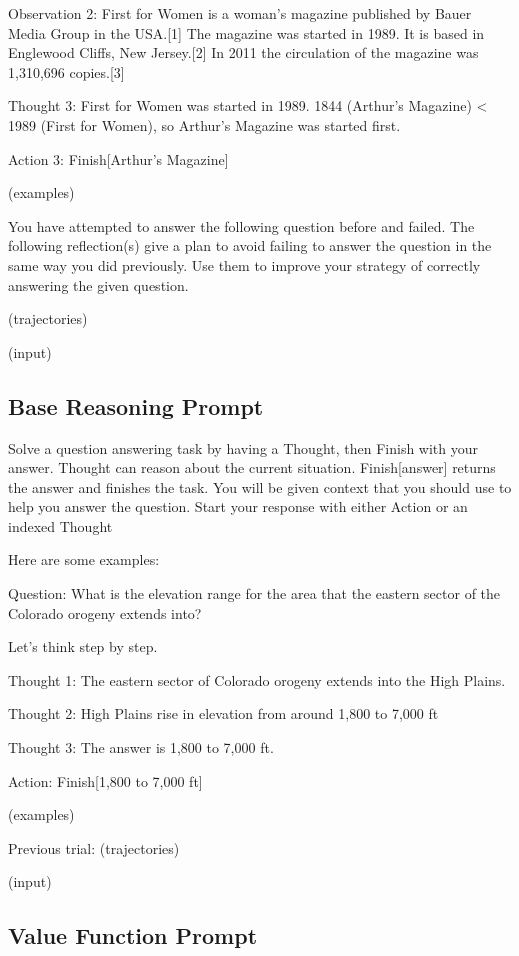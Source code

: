 \documentclass{article} \usepackage{iclr2024_conference,times}
\begin{document}
Observation 2: First for Women is a woman's magazine published by Bauer Media Group in the USA.[1] The magazine was started in 1989. It is based in Englewood Cliffs, New Jersey.[2] In 2011 the circulation of the magazine was 1,310,696 copies.[3]

Thought 3: First for Women was started in 1989. 1844 (Arthur's Magazine) < 1989 (First for Women), so Arthur's Magazine was started first.

Action 3: Finish[Arthur's Magazine]

(examples)

You have attempted to answer the following question before and failed. The following reflection(s) give a plan to avoid failing to answer the question in the same way you did previously. Use them to improve your strategy of correctly answering the given question.

(trajectories)

(input)

\subsection{Base Reasoning Prompt}

Solve a question answering task by having a Thought, then Finish with your answer. Thought can reason about the current situation. Finish[answer] returns the answer and finishes the task. You will be given context that you should use to help you answer the question. Start your response with either Action or an indexed Thought

Here are some examples:

Question: What is the elevation range for the area that the eastern sector of the Colorado orogeny extends into? 

Let's think step by step.

Thought 1: The eastern sector of Colorado orogeny extends into the High Plains. 

Thought 2: High Plains rise in elevation from around 1,800 to 7,000 ft

Thought 3: The answer is 1,800 to 7,000 ft.

Action: Finish[1,800 to 7,000 ft]

(examples)

Previous trial:
(trajectories)

(input)

\subsection{Value Function Prompt}
\end{document}
